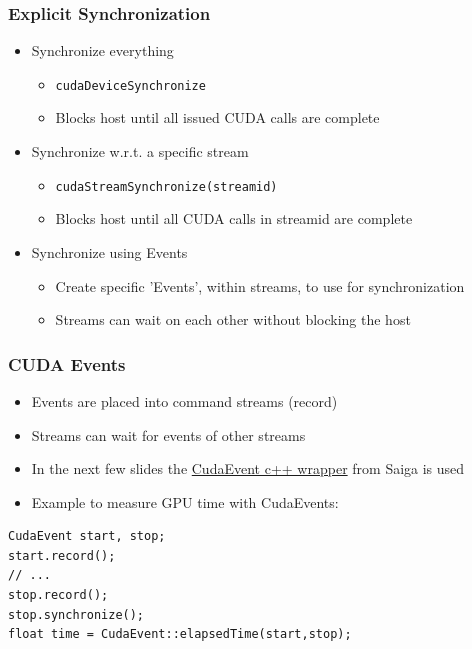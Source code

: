 \documentclass[aspectratio=169,handout]{beamer}
\begin{document}
\begin{frame}[fragile]
\frametitle{Explicit Synchronization}

\begin{itemize}
	\item Synchronize everything
	\begin{itemize}
		\item \texttt{cudaDeviceSynchronize}
		\item Blocks host until all issued CUDA calls are complete
	\end{itemize}
	\item Synchronize w.r.t. a specific stream
	\begin{itemize}
		\item \texttt{cudaStreamSynchronize(streamid)}
		\item Blocks host until all CUDA calls in streamid are complete
	\end{itemize}
	\item Synchronize using Events
	\begin{itemize}
		\item Create specific 'Events', within streams, to use for synchronization
		\item Streams can wait on each other without blocking the host
	\end{itemize}
\end{itemize}
\end{frame}


\begin{frame}[fragile]
\frametitle{CUDA Events}

\begin{itemize}
	\item Events are placed into command streams (record)
	\item Streams can wait for events of other streams
	\item In the next few slides the \href{https://github.com/darglein/saiga/blob/master/src/saiga/cuda/event.h}{CudaEvent c++ wrapper} from Saiga is used
	\item Example to measure GPU time with CudaEvents:
\end{itemize}
\begin{lstlisting}
CudaEvent start, stop;                           
start.record();                                  
// ...                                           
stop.record();                                   
stop.synchronize();                              
float time = CudaEvent::elapsedTime(start,stop); 
\end{lstlisting}
\end{frame}
\end{document}

